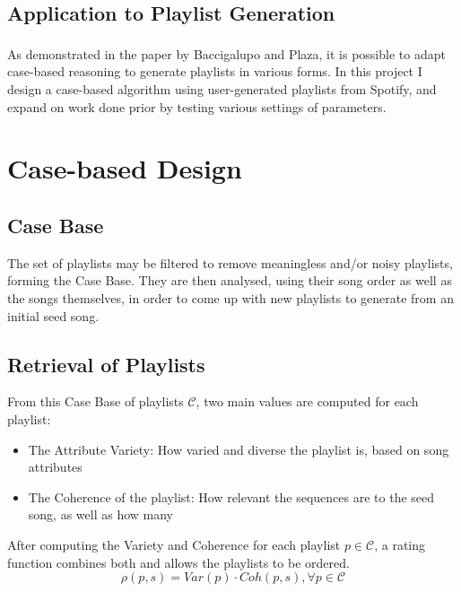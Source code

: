 \documentclass[a4paper, 12pt]{report}
\begin{document}
\section{Application to Playlist Generation}
As demonstrated in the paper by Baccigalupo and Plaza\textsuperscript{\cite{main}}, it is possible to adapt case-based reasoning to generate playlists in various forms.
In this project I design a case-based algorithm using user-generated playlists from Spotify, and expand on work done prior by testing various settings of parameters.



\chapter{Case-based Design}\label{casedesign}
\section{Case Base}
The set of playlists may be filtered to remove meaningless and/or noisy playlists, forming the Case Base.
They are then analysed, using their song order as well as the songs themselves, in order to 
come up with new playlists to generate from an initial seed song.

\section{Retrieval of Playlists}
From this Case Base of playlists \(\mathcal{C}\), two main values are computed for each playlist:
\begin{itemize}
    \item The Attribute Variety: How varied and diverse the playlist is, based on song attributes
    \item The Coherence of the playlist: How relevant the sequences are to the seed song, as well as how many
\end{itemize}

After computing the Variety and Coherence for each playlist \(p\in\mathcal{C}\), a rating function combines both and allows the playlists to be ordered.
\[\rho(p, s) = Var(p) \cdot Coh(p, s), \forall p \in \mathcal{C}\]
\end{document}
